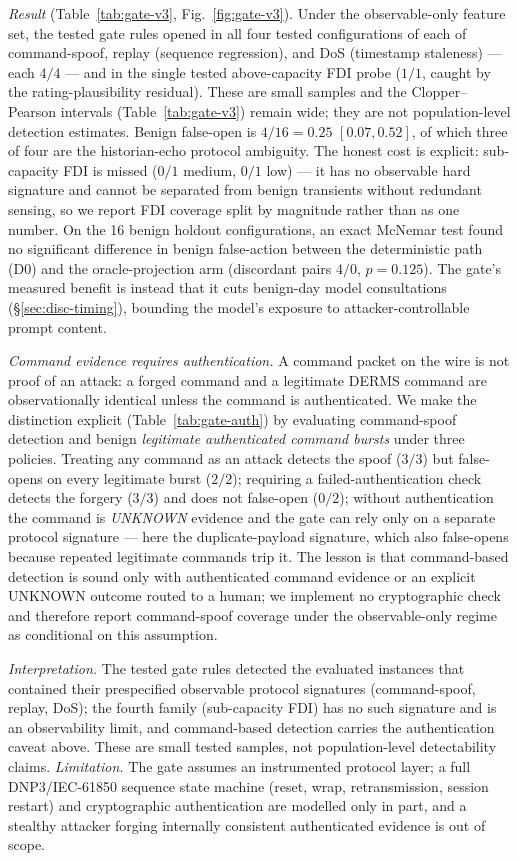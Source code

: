 \emph{Result} (Table~\ref{tab:gate-v3}, Fig.~\ref{fig:gate-v3}). Under the
observable-only feature set, the tested gate rules opened in all four tested
configurations of each of command-spoof, replay (sequence regression), and DoS
(timestamp staleness) --- each $4/4$ --- and in the single tested above-capacity
FDI probe ($1/1$, caught by the rating-plausibility residual). These are small
samples and the Clopper--Pearson intervals (Table~\ref{tab:gate-v3}) remain wide;
they are not population-level detection estimates. Benign false-open is
$4/16 = 0.25$ $[0.07, 0.52]$, of which three of four are the historian-echo
protocol ambiguity. The honest cost is explicit: sub-capacity FDI is missed ($0/1$
medium, $0/1$ low) --- it has no observable hard signature and cannot be
separated from benign transients without redundant sensing, so we report FDI
coverage split by magnitude rather than as one number. On the 16 benign holdout
configurations, an exact McNemar test found no significant difference in
benign false-action between the deterministic path (D0) and the oracle-projection
arm (discordant pairs $4/0$, $p=0.125$). The gate's measured benefit is instead
that it cuts benign-day model consultations (\S\ref{sec:disc-timing}), bounding
the model's exposure to attacker-controllable prompt content.

\emph{Command evidence requires authentication.} A command packet on the
wire is not proof of an attack: a forged command and a legitimate DERMS
command are observationally identical unless the command is authenticated.
We make the distinction explicit (Table~\ref{tab:gate-auth}) by evaluating
command-spoof detection and benign \emph{legitimate authenticated command
bursts} under three policies. Treating any command as an attack detects the
spoof ($3/3$) but false-opens on every legitimate burst ($2/2$); requiring a
failed-authentication check detects the forgery ($3/3$) and does not
false-open ($0/2$); without authentication the command is \emph{UNKNOWN}
evidence and the gate can rely only on a separate protocol signature --- here
the duplicate-payload signature, which also false-opens because repeated
legitimate commands trip it. The lesson is that command-based detection is
sound only with authenticated command evidence or an explicit UNKNOWN
outcome routed to a human; we implement no cryptographic check and therefore
report command-spoof coverage under the observable-only regime as
conditional on this assumption.

\emph{Interpretation.} The tested gate rules detected the evaluated instances
that contained their prespecified observable protocol signatures (command-spoof,
replay, DoS); the fourth family (sub-capacity FDI) has no such signature and is
an observability limit, and command-based detection carries the authentication
caveat above. These are small tested samples, not population-level detectability
claims. \emph{Limitation.} The gate assumes an
instrumented protocol layer; a full DNP3/IEC-61850 sequence state machine
(reset, wrap, retransmission, session restart) and cryptographic
authentication are modelled only in part, and a stealthy attacker forging
internally consistent authenticated evidence is out of scope.

